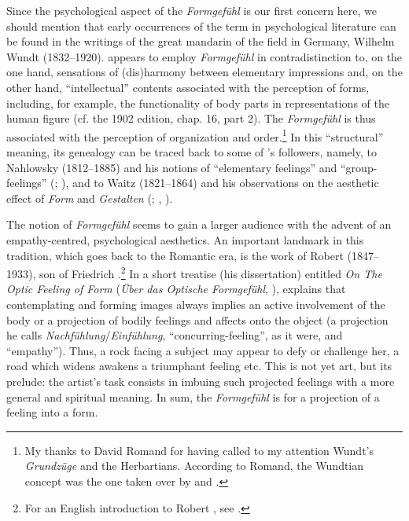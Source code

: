 \documentclass[output=paper]{langscibook}
\begin{document}
Since the psychological aspect of the \emph{Formgefühl} is our first concern here, we should mention that early occurrences of the term in psychological literature can be found in the writings of the great mandarin of the field in Germany, Wilhelm Wundt (1832--1920). \citet{Wundt1874} appears to employ \emph{Formgefühl} in contradistinction to, on the one hand, sensations of (dis)harmony between elementary impressions and, on the other hand, ``intellectual'' contents associated with the perception of forms, including, for example, the functionality of body parts in representations of the human figure (cf. the 1902 edition, chap. 16, part 2). The \emph{Formgefühl} is thus associated with the perception of organization and order.\footnote{My thanks to David Romand for having called to my attention Wundt’s \emph{Grundzüge} and the Herbartians. According to Romand, the Wundtian concept was the one taken over by {\Lipps} and {\Dessoir} \citep{RomandIP}.} In this ``structural'' meaning, its genealogy can be traced back to some of {\Herbart}'s followers, namely, to Nahlowsky (1812--1885) and his notions of ``elementary feelings'' and ``group-feelings'' (\citealt{Nahlowsky1862}; \citealt{Romand2018}), and to Waitz (1821--1864) and his observations on the aesthetic effect of \emph{Form} and \emph{Gestalten} (\citealt{Waitz1849}; \citealt{Romand2015}, \citealt{RomandIP}).

The notion of \emph{Formgefühl} seems to gain a larger audience with the advent of an empathy-centred, psychological aesthetics. An important landmark in this tradition, which goes back to the Romantic era, is the work of Robert {\Vischer} (1847--1933), son of Friedrich {\Vischer}.\footnote{For an English introduction to Robert {\Vischer}, see \citet{Barasch1989}.} In a short treatise (his dissertation) entitled \emph{On The Optic Feeling of Form} (\emph{Über das Optische Formgefühl}, \citeyear{Vischer1873}), {\Vischer} explains that contemplating and forming images always implies an active involvement of the body or a projection of bodily feelings and affects onto the object (a projection he calls \emph{Nachfühlung}/\emph{Einfühlung}, ``concurring-feeling'', as it were, and ``empathy''). Thus, a rock facing a subject may appear to defy or challenge her, a road which widens awakens a triumphant feeling etc. This is not yet art, but its prelude: the artist's task consists in imbuing such projected feelings with a more general and spiritual meaning. In sum, the \emph{Formgefühl} is for {\Vischer} a projection of a feeling into a form.
\end{document}
